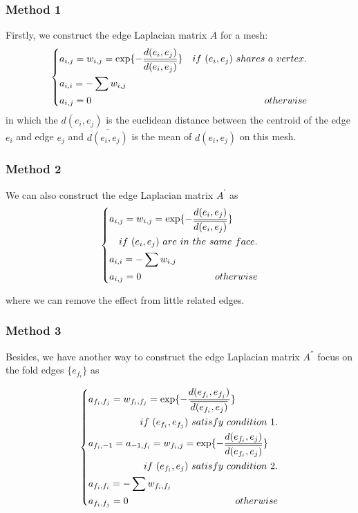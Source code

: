\subsubsection{Method 1}
Firstly, we construct the edge Laplacian matrix $A$ for a mesh:
\begin{equation}
\left\{
\begin{gathered}
a_{i,j} = w_{i,j} = \exp\{-\frac{d(e_i,e_j)}{\overline{d(e_i,e_j)}}\} \quad \hfill if~(e_i,e_j)~shares~a~vertex. \\
a_{i,i} = -\sum w_{i,j} \quad \hfill \\
a_{i,j} = 0 \quad \hfill otherwise \\
\end{gathered}
\right.
\end{equation}
in which the $d(e_i,e_j)$ is the euclidean distance between the centroid of the edge $e_i$ and edge $e_j$ and $\overline{d(e_i,e_j)}$ is the mean of $d(e_i,e_j)$ on this mesh.\\

\subsubsection{Method 2}
We can also construct the edge Laplacian matrix $A^{'}$ as 
\begin{equation}
\left\{
\begin{gathered}
a_{i,j} = w_{i,j} = \exp\{-\frac{d(e_i,e_j)}{\overline{d(e_i,e_j)}}\} \quad \hfill \\ \quad  \hfill if~(e_i,e_j)~are~in~the~same~face. \\
a_{i,i} = -\sum w_{i,j} \quad \hfill \\
a_{i,j} = 0 \quad \hfill otherwise \\
\end{gathered}
\right.
\end{equation}

where we can remove the effect from little related edges.

\subsubsection{Method 3}
Besides, we have another way to construct the edge Laplacian matrix $A^{''}$ focus on the fold edges $\{e_{f_i}\}$ as

\begin{equation}
\left\{
\begin{gathered}
a_{{f_i},{f_j}} = w_{{f_i},{f_j}} = \exp\{-\frac{d(e_{f_i},e_{f_j})}{\overline{d(e_{f_i},e_j)}}\} \quad \hfill \\ \quad  \hfill if~(e_{f_i},e_{f_j})~satisfy~condition~1. \\
a_{{f_i},-1} = a_{-1,{f_i}} =  w_{{f_i},j} = \exp\{-\frac{d(e_{f_i},e_j)}{\overline{d(e_{f_i},e_{j})}}\} \quad \hfill \\ \quad  \hfill if~(e_{f_i},e_j)~satisfy~condition~2.\\
a_{{f_i},f_i} = -\sum w_{{f_i},{f_j}} \quad \hfill \\
a_{{f_i},{f_j}} = 0 \quad \hfill otherwise \\
\end{gathered}
\right.
\end{equation}



